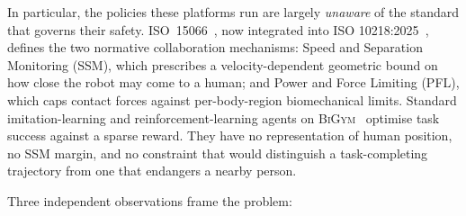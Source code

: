 \documentclass[11pt,a4paper]{report}
\newcommand{\ssm}{SSM}
\newcommand{\pfl}{PFL}
\newcommand{\iso}{ISO~15066}
\newcommand{\bigym}{\textsc{BiGym}}
\begin{document}
In particular, the policies these platforms run are largely
\emph{unaware} of the standard that governs their safety. \iso{}~\cite{iso15066}, now
integrated into ISO 10218:2025~\cite{iso10218,hartmann2026iso}, defines the two
normative collaboration mechanisms: Speed and Separation Monitoring
(\ssm{}), which prescribes a velocity-dependent geometric bound on
how close the robot may come to a human; and Power and Force
Limiting (\pfl{}), which caps contact forces against per-body-region
biomechanical limits. Standard imitation-learning and
reinforcement-learning agents on
\bigym{}~\cite{chernyadev2024bigym} optimise task success against a
sparse reward. They have no representation of human position, no
\ssm{} margin, and no constraint that would distinguish a
task-completing trajectory from one that endangers a nearby person.

Three independent observations frame the problem:
\end{document}

